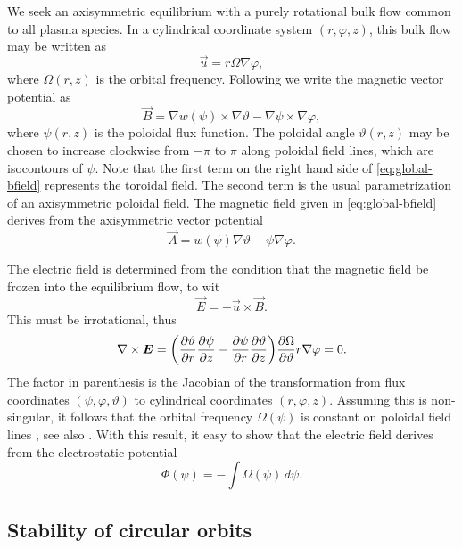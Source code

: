 \documentclass[aps,pre,notitlepage,amsmath,amssymb,amsfonts,nobibnotes,nofootinbib]{revtex4-1}
\begin{document}
We seek an axisymmetric equilibrium with a purely rotational bulk flow common
to all plasma species. In a cylindrical coordinate system $(r,\varphi,z)$,
this bulk flow may be written as
\begin{equation}
  \vec{u} = r\Omega\nabla\varphi,
\end{equation}
where $\Omega(r,z)$ is the orbital frequency. Following
\citet{Kaufman1972,Cary1983} we write the magnetic vector potential as
\begin{equation}
  \label{eq:global-bfield}
  \vec{B} =
  \nabla w(\psi)\times\nabla\vartheta - \nabla\psi\times\nabla\varphi,
\end{equation}
where $\psi(r,z)$ is the poloidal flux function. The poloidal angle
$\vartheta(r,z)$ may be chosen to increase clockwise from $-\pi$ to $\pi$
along poloidal field lines, which are isocontours of $\psi$. Note that the
first term on the right hand side of \cref{eq:global-bfield} represents the
toroidal field. The second term is the usual parametrization of an
axisymmetric poloidal field. The magnetic field given in
\cref{eq:global-bfield} derives from the axisymmetric vector potential
\begin{equation}
  \vec{A} = w(\psi)\nabla\vartheta - \psi\nabla\varphi.
\end{equation}

The electric field is determined from the condition that the magnetic field be
frozen into the equilibrium flow, to wit
\begin{equation}
  \vec{E} = -\vec{u}\times\vec{B}.
\end{equation}
This must be irrotational, thus
\begin{equation}
  \nabla\times\vec{E} =
  \left(
    \pder{\vartheta}{r}\pder{\psi}{z} -
    \pder{\psi}{r}\pder{\vartheta}{z}
  \right)
  \pder{\Omega}{\vartheta}r\nabla\varphi = 0.
\end{equation}
The factor in parenthesis is the Jacobian of the transformation from flux
coordinates $(\psi,\varphi,\vartheta)$ to cylindrical coordinates
$(r,\varphi,z)$. Assuming this is non-singular, it follows that the orbital
frequency $\Omega(\psi)$ is constant on poloidal field lines
\citep{Ferraro1937}, see also \citet{Papaloizou1992}. With this result, it
easy to show that the electric field derives from the electrostatic potential
\begin{equation}
  \Phi(\psi) = -\int\!\Omega(\psi)\,d\psi.
\end{equation}

\subsection{Stability of circular orbits}
\end{document}
